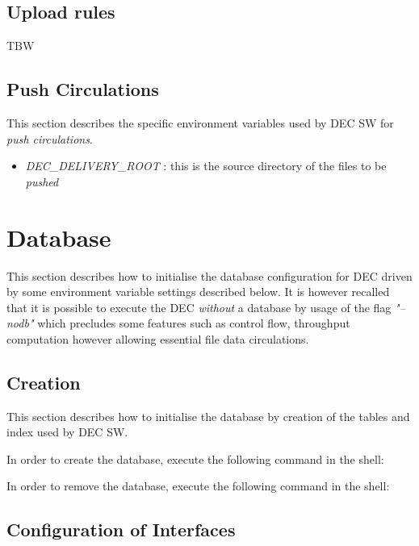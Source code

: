 \documentclass[dec_sum_main.tex]{subfiles}
\begin{document}
\label{Upload Rules}
\subsection{Upload rules}
TBW



\subsection{Push Circulations}
This section describes the specific environment variables used by DEC SW for \textit{push circulations}.
\begin{itemize}
	\item \textit{DEC\_DELIVERY\_ROOT} : this is the source directory of the files to be \textit{pushed} 
\end{itemize}

\section{Database}
This section describes how to initialise the database configuration for DEC driven by some environment variable settings described below. It is however recalled that it is possible to execute the DEC \textit{without} a database by usage of the flag \textit{"--nodb"} which precludes some features such as control flow, throughput computation however allowing essential file data circulations.


\subsection{Creation}

This section describes how to initialise the database by creation of the tables and index used by DEC SW.

\par

\noindent
In order to create the database, execute the following command in the shell:

 \newline


\par 

\noindent
In order to remove the database, execute the following command in the shell:



\subsection{Configuration of Interfaces}
\end{document}
